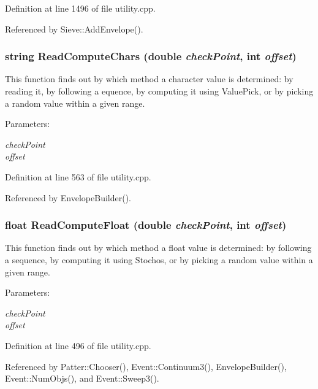 Definition at line 1496 of file utility.cpp.

Referenced by Sieve::Add\-Envelope().
\subsubsection{\setlength{\rightskip}{0pt plus 5cm}string Read\-Compute\-Chars (double {\em check\-Point}, int {\em offset})}\label{utility_8cpp_a14}


This function finds out by which method a character value is determined: by reading it, by following a equence, by computing it using Value\-Pick, or by picking a random value within a given range. \begin{Desc}
\item[Parameters:]
\begin{description}
\item[{\em check\-Point}]\item[{\em offset}]\end{description}
\end{Desc}


Definition at line 563 of file utility.cpp.

Referenced by Envelope\-Builder().
\subsubsection{\setlength{\rightskip}{0pt plus 5cm}float Read\-Compute\-Float (double {\em check\-Point}, int {\em offset})}\label{utility_8cpp_a12}


This function finds out by which method a float value is determined: by following a sequence, by computing it using Stochos, or by picking a random value within a given range. \begin{Desc}
\item[Parameters:]
\begin{description}
\item[{\em check\-Point}]\item[{\em offset}]\end{description}
\end{Desc}


Definition at line 496 of file utility.cpp.

Referenced by Patter::Chooser(), Event::Continuum3(), Envelope\-Builder(), Event::Num\-Objs(), and Event::Sweep3().
